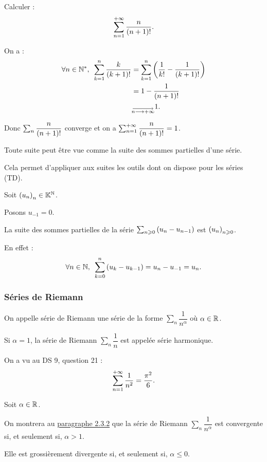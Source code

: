 \begin{exoex}
Calculer : \[\sum_{n=1}^{+\infty}\dfrac{n}{\left(n+1\right)!}.\]
\end{exoex}

\begin{corr}
On a : \[\begin{aligned}
\quantifs{\forall n\in\Ns}\sum_{k=1}^n\dfrac{k}{\paren{k+1}!}&=\sum_{k=1}^n\paren{\dfrac{1}{k!}-\dfrac{1}{\paren{k+1}!}} \\
&=1-\dfrac{1}{\paren{n+1}!} \\
&\tendqd{n\to\pinf}1.
\end{aligned}\]

Donc \(\sum_n\dfrac{n}{\left(n+1\right)!}\) converge et on a \(\sum_{n=1}^{+\infty}\dfrac{n}{\left(n+1\right)!}=1\).
\end{corr}

\begin{rem}
Toute suite peut être vue comme la suite des sommes partielles d'une série.

Cela permet d'appliquer aux suites les outils dont on dispose pour les séries (\cf TD).
\end{rem}

\begin{dem}
Soit \(\left(u_n\right)_n\in\mathbb{K}^{\mathbb{N}}\).

Posons \(u_{-1}=0\).

La suite des sommes partielles de la série \(\sum_{n\geqslant0}\left(u_n-u_{n-1}\right)\) est \(\left(u_n\right)_{n\geqslant0}\).

En effet : \[\quantifs{\forall n\in\N}\sum_{k=0}^n\paren{u_k-u_{k-1}}=u_n-u_{-1}=u_n.\]
\end{dem}

\subsubsection{Séries de Riemann}

\begin{defi}
On appelle série de Riemann une série de la forme \(\sum_n\dfrac{1}{n^\alpha}\) où \(\alpha\in\mathbb{R}\).

Si \(\alpha=1\), la série de Riemann \(\sum_n\dfrac{1}{n}\) est appelée série harmonique.
\end{defi}

\begin{ex}
On a vu au DS 9, question 21 : \[\sum_{n=1}^{+\infty}\dfrac{1}{n^2}=\dfrac{\pi^2}{6}.\]
\end{ex}

\begin{rem}
Soit \(\alpha\in\mathbb{R}\).

On montrera au \hyperref[subsubsec:applicationAuxSériesDeRiemann]{paragraphe 2.3.2} que la série de Riemann \(\sum_{n}\dfrac{1}{n^\alpha}\) est convergente si, et seulement si, \(\alpha>1\).

Elle est grossièrement divergente si, et seulement si, \(\alpha\leq0\).
\end{rem}

